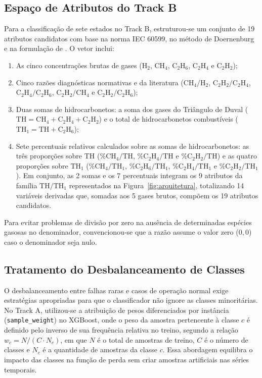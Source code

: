 \subsection{Espaço de Atributos do Track B}

Para a classificação de sete estados no Track B, estruturou-se um conjunto de 19 atributos candidatos com base na norma IEC 60599, no método de Doernenburg e na formulação de . O vetor inclui:
\begin{enumerate}
    \item As cinco concentrações brutas de gases ($\text{H}_2$, $\text{CH}_4$, $\text{C}_2\text{H}_6$, $\text{C}_2\text{H}_4$ e $\text{C}_2\text{H}_2$);
    \item Cinco razões diagnósticas normativas e da literatura ($\text{CH}_4/\text{H}_2$, $\text{C}_2\text{H}_2/\text{C}_2\text{H}_4$, $\text{C}_2\text{H}_4/\text{C}_2\text{H}_6$, $\text{C}_2\text{H}_2/\text{CH}_4$ e $\text{C}_2\text{H}_2/\text{C}_2\text{H}_6$);
    \item Duas somas de hidrocarbonetos: a soma dos gases do Triângulo de Duval ($\text{TH} = \text{CH}_4 + \text{C}_2\text{H}_4 + \text{C}_2\text{H}_2$) e o total de hidrocarbonetos combustíveis ($\text{TH}_1 = \text{TH} + \text{C}_2\text{H}_6$);
    \item Sete percentuais relativos calculados sobre as somas de hidrocarbonetos: as três proporções sobre $\text{TH}$ ($\% \text{CH}_4/\text{TH}$, $\% \text{C}_2\text{H}_4/\text{TH}$ e $\% \text{C}_2\text{H}_2/\text{TH}$) e as quatro proporções sobre $\text{TH}_1$ ($\% \text{CH}_4/\text{TH}_1$, $\% \text{C}_2\text{H}_6/\text{TH}_1$, $\% \text{C}_2\text{H}_4/\text{TH}_1$ e $\% \text{C}_2\text{H}_2/\text{TH}_1$). Em conjunto, as 2 somas e os 7 percentuais integram os 9 atributos da família $\text{TH}/\text{TH}_1$ representados na Figura~\ref{fig:arquitetura}, totalizando 14 variáveis derivadas que, somadas aos 5 gases brutos, compõem os 19 atributos candidatos.
\end{enumerate}

Para evitar problemas de divisão por zero na ausência de determinadas espécies gasosas no denominador, convencionou-se que a razão assume o valor zero ($0,0$) caso o denominador seja nulo.

\subsection{Tratamento do Desbalanceamento de Classes}

O desbalanceamento entre falhas raras e casos de operação normal exige estratégias apropriadas para que o classificador não ignore as classes minoritárias. No Track A, utilizou-se a atribuição de pesos diferenciados por instância (\texttt{sample\_weight}) no XGBoost, onde o peso da amostra pertencente à classe $c$ é definido pelo inverso de sua frequência relativa no treino, segundo a relação $w_c = N / (C \cdot N_c)$, em que $N$ é o total de amostras de treino, $C$ é o número de classes e $N_c$ é a quantidade de amostras da classe $c$. Essa abordagem equilibra o impacto das classes na função de perda sem criar amostras artificiais nas séries temporais.

